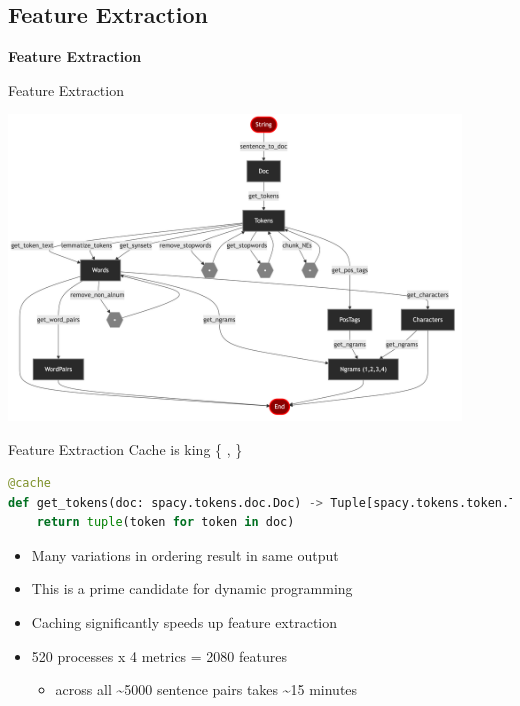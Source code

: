 \documentclass{beamer}
\begin{document}
\subsection{Feature Extraction}
\begin{frame}{}
    \begin{center}
        \Large \textbf{Feature Extraction}
    \end{center}
\end{frame}

\begin{frame}{Feature Extraction}
    \begin{center}
        \includegraphics[width=0.9\textwidth]{figures/mermaid/permutations.md-1.png}
    \end{center}
\end{frame}

\begin{frame}[fragile]{Feature Extraction}
    Cache is king \{ \textdollar{}, \texteuro{} \}
    \begin{lstlisting}[language=Python]
@cache
def get_tokens(doc: spacy.tokens.doc.Doc) -> Tuple[spacy.tokens.token.Token, ...]:
    return tuple(token for token in doc)
    \end{lstlisting}
    \begin{itemize}
        \item Many variations in ordering result in same output
        \item This is a prime candidate for dynamic programming
        \item Caching significantly speeds up feature extraction
        \item 520 processes x 4 metrics = 2080 features
        \begin{itemize}
            \item across all \textasciitilde{}5000 sentence pairs takes \textasciitilde{}15 minutes
        \end{itemize}
    \end{itemize}
\end{frame}
\end{document}
